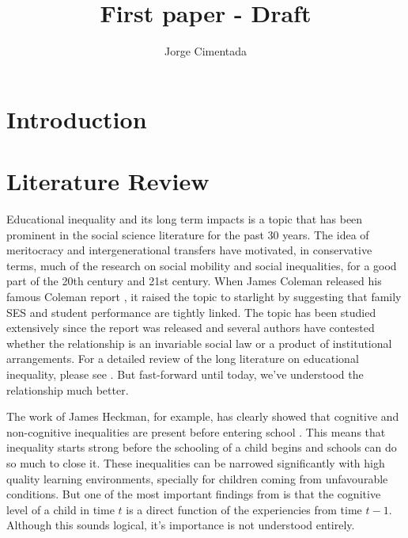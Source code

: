\documentclass[11pt, a4paper]{article}\usepackage[]{graphicx}\usepackage[]{color}
\title{First paper - Draft}
\author{Jorge Cimentada}
\begin{document}
\setlength{\parindent}{2em}
\setlength{\parskip}{1em}

\maketitle





\tableofcontents












\section{Introduction}

\section{Literature Review}
Educational inequality and its long term impacts is a topic that has been prominent in the social science literature for the past 30 years. The idea of meritocracy and intergenerational transfers have motivated, in conservative terms, much of the research on social mobility and social inequalities, for a good part of the 20th century and 21st century. When James Coleman released his famous Coleman report \citep{coleman1966}, it raised the topic to starlight by suggesting that family SES and student performance are tightly linked. The topic has been studied extensively since the report was released and several authors have contested whether the relationship is an invariable social law or a product of institutional arrangements. For a detailed review of the long literature on educational inequality, please see \citet{gamoran2001}. But fast-forward until today, we've understood the relationship much better.

The work of James Heckman, for example, has clearly showed that cognitive and non-cognitive inequalities are present before entering school \citep{heckman2006}. This means that inequality starts strong before the schooling of a child begins and schools can do so much to close it. These inequalities can be narrowed significantly with high quality learning environments, specially for children coming from unfavourable conditions. But one of the most important findings from \citet{cunha2006} is that the cognitive level of a child in time \(t\) is a direct function of the experiencies from time \(t-1\). Although this sounds logical, it's importance is not understood entirely.
\end{document}
